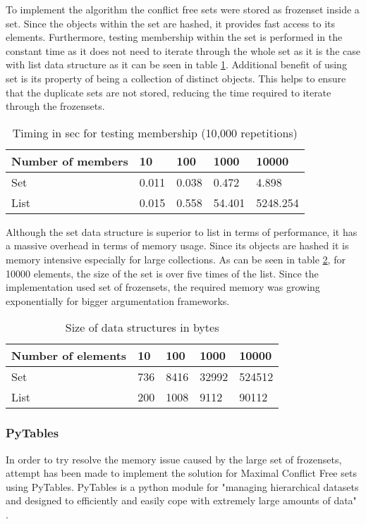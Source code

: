 To implement the algorithm the conflict free sets were stored as frozenset inside a set. Since the objects within the set are hashed, it provides fast access to its elements. Furthermore, testing membership within the set is performed in the constant time as it does not need to iterate through the whole set as it is the case with list data structure as it can be seen in table \ref{table:timingsMembership}. Additional benefit of using set is its property of being a collection of distinct objects. This helps to ensure that the duplicate sets are not stored, reducing the time required to iterate through the frozensets.

\begin{table}[h]
	\centering
	\caption{Timing in sec for testing membership (10,000 repetitions)}
	\label{table:timingsMembership}
	\begin{tabular}{lllll}
		\hline
		Number of members & 10    & 100   & 1000   & 10000 \\ \hline
		Set                & 0.011 & 0.038 & 0.472  & 4.898 \\
		List               & 0.015 & 0.558 & 54.401 & 5248.254 \\     
	\end{tabular}
\end{table}

Although the set data structure is superior to list in terms of performance, it has a massive overhead in terms of memory usage. Since its objects are hashed it is memory intensive especially for large collections. As can be seen in table \ref{table:sizeDataStructures}, for 10000 elements, the size of the set is over five times of the list. Since the implementation used set of frozensets, the required memory was growing exponentially for bigger argumentation frameworks.

\begin{table}[h]	
	\centering
	\caption{Size of data structures in bytes}
	\label{table:sizeDataStructures}
	\begin{tabular}{lllll}
		\hline
		Number of elements & 10  & 100  & 1000  & 10000  \\ \hline
		Set                & 736 & 8416 & 32992 & 524512 \\
		List               & 200 & 1008 & 9112  & 90112 
	\end{tabular}
\end{table}


\subsubsection{PyTables}
In order to try resolve the memory issue caused by the large set of frozensets, attempt has been made to implement the solution for Maximal Conflict Free sets using PyTables. PyTables is a python module for "managing hierarchical datasets and designed to efficiently and easily cope with extremely large amounts of data" \citep{pytables}.


